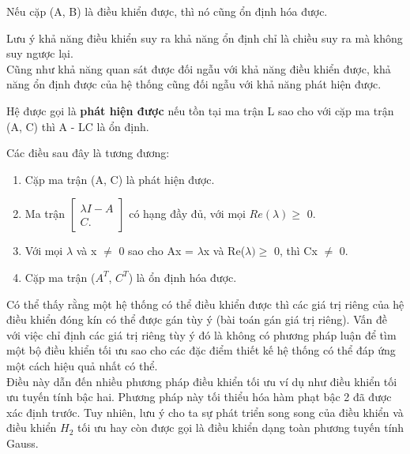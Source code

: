  \begin{coroll}
 Nếu cặp (A, B) là điều khiển được,  thì nó cũng ổn định hóa được.
 \end{coroll}
 Lưu ý khả năng điều khiển suy ra khả năng ổn định chỉ là chiều suy ra mà không suy ngược lại.\\
 Cũng như khả năng quan sát được đối ngẫu với khả năng điều khiển được, khả năng ổn định được của hệ thống cũng đối ngẫu với khả năng phát hiện được.\\
 \begin{definition}
 Hệ được gọi là \textbf{phát hiện được} nếu tồn tại ma trận L sao cho với cặp ma trận (A, C) thì A - LC là ổn định.
 \end{definition}
\begin{theorem}
Các điều sau đây là tương đương:
\begin{enumerate}
    \item Cặp ma trận (A, C) là phát hiện được.
    \item Ma trận 
    $\begin{bmatrix}
        \lambda I - A \\
        C.
    \end{bmatrix}$
    có hạng đầy đủ, với mọi $Re(\lambda) \geq$ 0.
    \item Với mọi $\lambda$ và x $\ne$ 0 sao cho Ax = $\lambda$x và Re($\lambda) \geq$ 0, thì Cx $\ne$ 0.
    \item Cặp ma trận ($A^{T}$, $C^{T}$) là ổn định hóa được.
\end{enumerate}
\end{theorem}
Có thể thấy rằng một hệ thống có thể điều khiển được thì các giá trị riêng của hệ điều khiển đóng kín có thể được gán tùy ý (bài toán gán giá trị riêng). Vấn đề với việc chỉ định các giá trị riêng tùy ý đó là không có phương pháp luận để tìm một bộ điều khiển tối ưu sao cho các đặc điểm thiết kế hệ thống có thể đáp ứng một cách hiệu quả nhất có thể.\\
Điều này dẫn đến nhiều phương pháp điều khiển tối ưu ví dụ như điều khiển tối ưu tuyến tính bậc hai. Phương pháp này tối thiểu hóa hàm phạt bậc 2 đã được xác định trước. Tuy nhiên, lưu ý \cite{7} cho ta sự phát triển song song của điều khiển \hinf và điều khiển \emph{$H_2$} tối ưu hay còn được gọi là điều khiển dạng toàn phương tuyến tính Gauss.

